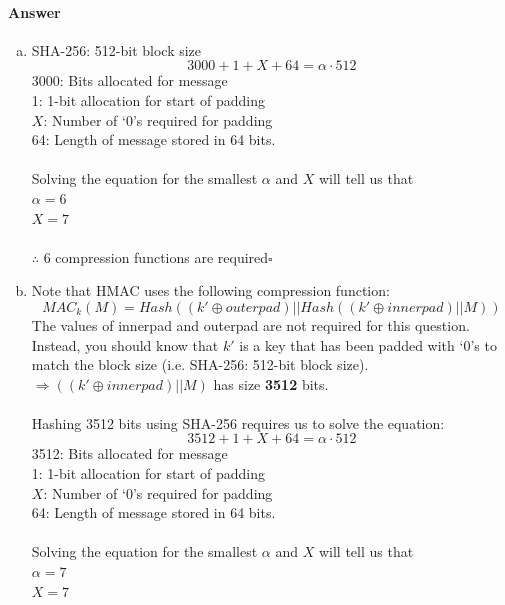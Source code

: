 \documentclass[12pt]{article}
\begin{document}
\paragraph{Answer}
\begin{enumerate}[(a)]
\item SHA-256: 512-bit block size
\begin{equation*}
3000 + 1 + X + 64=\alpha \cdot 512
\end{equation*}
3000: Bits allocated for message\\
1: 1-bit allocation for start of padding\\
$X$: Number of `0's required for padding\\
64: Length of message stored in 64 bits.\\\\
Solving the equation for the smallest $\alpha$ and $X$ will tell us that
\\$\alpha=6$\\$X=7$\\\\
$\therefore$ 6 compression functions are required\hfill $\square$
\item Note that HMAC uses the following compression function:
\begin{equation*}
MAC_k(M)=Hash((k'\oplus outerpad)||Hash((k'\oplus innerpad)||M))
\end{equation*}
The values of innerpad and outerpad are not required for this question. Instead, you should know that $k'$ is a key that has been padded with `0's to match the block size (i.e. SHA-256: 512-bit block size).\\
$\Rightarrow ((k'\oplus innerpad) || M)$ has size \textbf{3512} bits.\\\\
Hashing 3512 bits using SHA-256 requires us to solve the equation:
\begin{equation*}
3512+1+X+64=\alpha\cdot 512
\end{equation*}
3512: Bits allocated for message\\
1: 1-bit allocation for start of padding\\
$X$: Number of `0's required for padding\\
64: Length of message stored in 64 bits.\\\\
Solving the equation for the smallest $\alpha$ and $X$ will tell us that
\\$\alpha=7$\\$X=7$\\\\

\end{enumerate}
\end{document}
